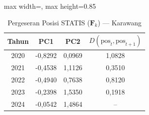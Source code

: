 \begin{table}[H]
\centering
\caption{Pergeseran Posisi STATIS ($\mathbf{F}_k$) --- Karawang} \label{tab:app2jarak_statis_skor_karawang}
\begin{adjustbox}{max width=\textwidth, max height=0.85\textheight}
\begin{tabular}{|c|c|c|c|}
\hline
\textbf{Tahun} & \textbf{PC1} & \textbf{PC2} & \textbf{$D(\text{pos}_t, \text{pos}_{t+1})$} \\
\hline
2020 & -0,8292 & 0,0969 & 1,0828 \\
2021 & -0,4538 & 1,1126 & 0,3510 \\
2022 & -0,4940 & 0,7638 & 0,8120 \\
2023 & -0,2398 & 1,5350 & 0,1918 \\
2024 & -0,0542 & 1,4864 & -- \\
\hline
\end{tabular}
\end{adjustbox}
\end{table}